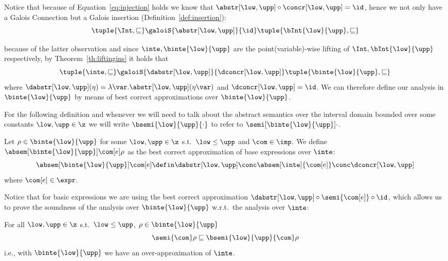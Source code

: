 Notice that because of Equation~\eqref{eq:injection} holds we know
that \(\abstr[\low,\upp] \circ\concr[\low,\upp] = \id\), hence we not only
have a Galois Connection but a Galois insertion
(Definition~\ref{def:insertion}):
\begin{equation}
  \tuple{\Int, \sqsubseteq} \galoiS{\abstr[\low, \upp]}{\id} \tuple{\bInt{\low}{\upp}, \sqsubseteq}
\end{equation}

because of the latter observation and since
\(\inte, \binte{\low}{\upp}\) are the point(variable)-wise lifting of
\(\Int, \bInt{\low}{\upp}\) respectively, by Theorem~\ref{th:liftingins}
it holds that
\begin{equation}\label{eq:inteinsert}
  \tuple{\inte, \sqsubseteq} \galoiS{\dabstr[\low,\upp]}{\dconcr[\low,\upp]} \tuple{\binte{\low}{\upp}, \sqsubseteq}
\end{equation}
where
\({\dabstr[\low,\upp]}(\eta) = \lambda \var
. \abstr[\low,\upp](\eta\var)\) and \(\dconcr[\low,\upp] = \id\).
We can therefore define our analysis in \(\binte{\low}{\upp}\) by means
of best correct approximations over \(\binte{\low}{\upp}\).

\begin{notation}
  For the following definition and whenever we will need to talk about
  the abstract semantics over the interval domain bounded over some
  constants \(\low, \upp \in \z\) we will write
  \(\bsemi{\low}{\upp}{\cdot}\) to refer to
  \(\semi[\binte{\low}{\upp}]{\cdot}\).
\end{notation}

\begin{definition}\label{def:boundedanalysis}
  Let \(\rho \in \binte{\low}{\upp}\) for some \(\low, \upp \in \z\) s.t.\
  \(\low \leq \upp\) and \(\com \in \imp\). We define
  \(\absem[\binte{\low}{\upp}]{\com[e]}\rho\) as the best correct
  approximation of base expressions over \(\inte\):
  \begin{equation*}
    \absem[\binte{\low}{\upp}]{\com[e]} \defin \dabstr[\low,\upp] \conc \absem[\inte]{\com[e]} \conc \dconcr[\low,\upp]
  \end{equation*}
  where \(\com[e]\in\expr\). 
\end{definition}
\noindent
Notice that for basic expressions we are using the best correct
approximation \(\dabstr[\low,\upp] \circ \semi{\com[e]} \circ \id\),
which allows us to prove the soundness of the analysis over
\(\binte{\low}{\upp}\) w.r.t.\ the analysis over \(\inte\):
\begin{lemma}\label{le:leq}
  For all \(\low, \upp\in\z\) s.t.\ \(\low \leq \upp\),
  \(\rho \in \binte{\low}{\upp}\)
  \begin{equation*}
    \semi{\com}\rho \sqsubseteq \bsemi{\low}{\upp}{\com}\rho
  \end{equation*}
  i.e., with \(\binte{\low}{\upp}\) we have an over-approximation of \(\inte\).
\end{lemma}

